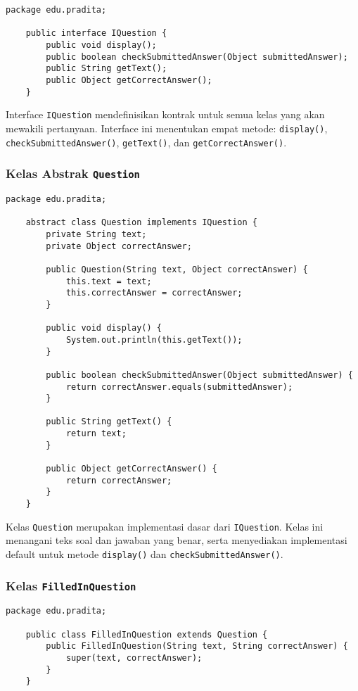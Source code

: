 \begin{lstlisting}[style=JavaStyle]
	package edu.pradita;
	
	public interface IQuestion {
		public void display();
		public boolean checkSubmittedAnswer(Object submittedAnswer);
		public String getText();
		public Object getCorrectAnswer();
	}
\end{lstlisting}

Interface \texttt{IQuestion} mendefinisikan kontrak untuk semua kelas yang akan mewakili pertanyaan. Interface ini menentukan empat metode: \texttt{display()}, \texttt{checkSubmittedAnswer()}, \texttt{getText()}, dan \texttt{getCorrectAnswer()}.

\subsubsection{Kelas Abstrak \texttt{Question}}

\begin{lstlisting}[style=JavaStyle]
	package edu.pradita;
	
	abstract class Question implements IQuestion {
		private String text;
		private Object correctAnswer;
		
		public Question(String text, Object correctAnswer) {
			this.text = text;
			this.correctAnswer = correctAnswer;
		}
		
		public void display() {
			System.out.println(this.getText());
		}
		
		public boolean checkSubmittedAnswer(Object submittedAnswer) {
			return correctAnswer.equals(submittedAnswer);
		}
		
		public String getText() {
			return text;
		}
		
		public Object getCorrectAnswer() {
			return correctAnswer;
		}
	}
\end{lstlisting}

Kelas \texttt{Question} merupakan implementasi dasar dari \texttt{IQuestion}. Kelas ini menangani teks soal dan jawaban yang benar, serta menyediakan implementasi default untuk metode \texttt{display()} dan \texttt{checkSubmittedAnswer()}.

\subsubsection{Kelas \texttt{FilledInQuestion}}

\begin{lstlisting}[style=JavaStyle]
	package edu.pradita;
	
	public class FilledInQuestion extends Question {
		public FilledInQuestion(String text, String correctAnswer) {
			super(text, correctAnswer);
		}
	}
\end{lstlisting}


